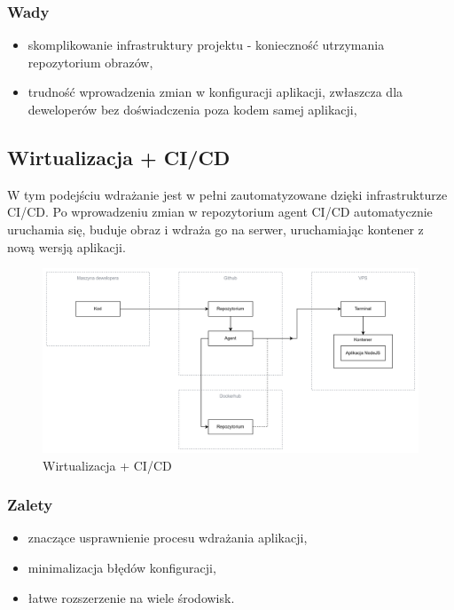 \documentclass{article}
\begin{document}
\subsubsection{Wady}

\begin{itemize}
    \item skomplikowanie infrastruktury projektu - konieczność utrzymania repozytorium obrazów,
    \item trudność wprowadzenia zmian w konfiguracji aplikacji, zwłaszcza dla deweloperów bez doświadczenia poza kodem samej aplikacji,
\end{itemize}

\subsection{Wirtualizacja + CI/CD}

W tym podejściu wdrażanie jest w pełni zautomatyzowane dzięki infrastrukturze CI/CD. Po wprowadzeniu zmian w repozytorium agent CI/CD automatycznie uruchamia się, buduje obraz i wdraża go na serwer, uruchamiając kontener z nową wersją aplikacji.

\begin{figure}[H]
    \centering
    \includegraphics[width=1\linewidth]{automatycznaWirtualizacja.png}
    \caption{Wirtualizacja + CI/CD}
    \label{fig:enter-label}
\end{figure}

\subsubsection{Zalety}

\begin{itemize}
    \item znaczące usprawnienie procesu wdrażania aplikacji,
    \item minimalizacja błędów konfiguracji,
    \item łatwe rozszerzenie na wiele środowisk.
\end{itemize}
\end{document}
